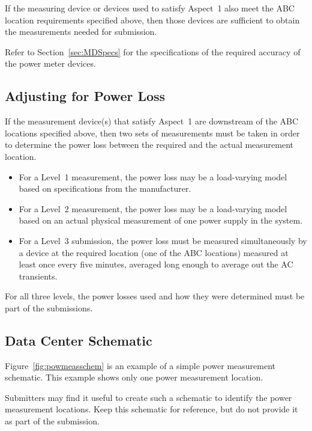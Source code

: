 \noindent
If the measuring device or devices used to satisfy Aspect~1 also meet the ABC location requirements specified above, then those devices are sufficient to obtain the measurements needed for submission.
\wl

\noindent
Refer to Section~\ref{sec:MDSpecs} for the specifications of the required accuracy of the power meter devices.

\subsection{Adjusting for Power Loss}
\label{sec:AfPL}
\noindent
If the measurement device(s) that satisfy Aspect~1 are downstream of the ABC locations specified above, then two sets of measurements must be taken in order to determine the power loss between the required and the actual measurement location.

\begin{itemize}
\item
For a Level~1 measurement, the power loss may be a load-varying model based on specifications from the manufacturer.
\item
For a Level~2 measurement, the power loss may be a load-varying model based on an actual physical measurement of one power supply in the system.
\item
For a Level~3 submission, the power loss must be measured simultaneously by a device at the required location (one of the ABC locations) measured at least once every five minutes, averaged long enough to average out the AC transients.
\end{itemize}

\noindent
For all three levels, the power losses used and how they were determined must be part of the submissions.

\subsection{Data Center Schematic}
\noindent
Figure~\ref{fig:powmeasschem} is an example of a simple power measurement schematic.
This example shows only one power measurement location.
\wl


\noindent
Submitters may find it useful to create such a schematic to identify the power measurement locations.
Keep this schematic for reference, but do not provide it as part of the submission.


